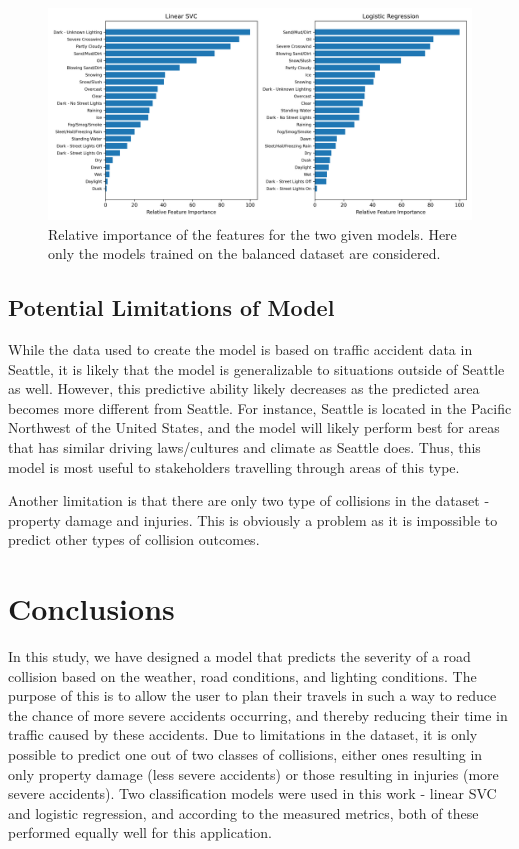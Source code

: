 \documentclass[12pt,a4paper,oneside]{article}
\begin{document}
\begin{figure}[htpb!]
    \centering
    \caption{Relative importance of the features for the two given models. Here only the models trained on the balanced dataset are considered.}
    \label{fig:feature_importance}
    \includegraphics[width=\textwidth]{feature_importance.png}
\end{figure}

\subsection{Potential Limitations of Model}

While the data used to create the model is based on traffic accident data in Seattle, it is likely that the model is generalizable to situations outside of Seattle as well. 
However, this predictive ability likely decreases as the predicted area becomes more different from Seattle. 
For instance, Seattle is located in the Pacific Northwest of the United States, and the model will likely perform best for areas that has similar driving laws/cultures and climate as Seattle does. 
Thus, this model is most useful to stakeholders travelling through areas of this type. 
 
Another limitation is that there are only two type of collisions in the dataset - property damage and injuries. This is obviously a problem as it is impossible to predict other types of collision outcomes. 

\section{Conclusions}

In this study, we have designed a model that predicts the severity of a road collision based on the weather, road conditions, and lighting conditions. 
The purpose of this is to allow the user to plan their travels in such a way to reduce the chance of more severe accidents occurring, and thereby reducing their time in traffic caused by these accidents. 
Due to limitations in the dataset, it is only possible to predict one out of two classes of collisions, either ones resulting in only property damage (less severe accidents) or those resulting in injuries (more severe accidents). 
Two classification models were used in this work - linear SVC and logistic regression, and according to the measured metrics, both of these performed equally well for this application. 
\end{document}
